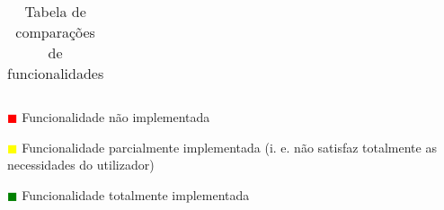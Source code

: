 \begin{table}[!ht]
\begin{center}
\begin{tabular}{|p{4cm}|p{0.1cm}|p{0.1cm}|p{0.1cm}|p{0.1cm}|}
			
			
		\end{tabular}
	\end{center}
	\hspace{1.2cm}	\textcolor{red}{$\blacksquare$} Funcionalidade não implementada
	
	\hspace{1.2cm}     \textcolor{yellow}{$\blacksquare$} Funcionalidade parcialmente implementada (i. e. não satisfaz totalmente as necessidades do utilizador)
	
	\hspace{1.2cm}     \textcolor{green}{$\blacksquare$} Funcionalidade totalmente implementada 
	\begin{center}
		\caption{Tabela de comparações de funcionalidades}
		\label{tab:comparacao1}
	\end{center}
\end{table}



